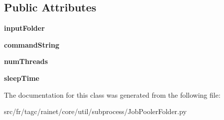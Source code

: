 \subsection*{Public Attributes}
\begin{DoxyCompactItemize}
\item 
\hypertarget{classsrc_1_1fr_1_1tagc_1_1rainet_1_1core_1_1util_1_1subprocess_1_1JobPoolerFolder_1_1JobPoolerFolder_a09a5abc8e78560dda7f866e0ab3025b1}{{\bfseries input\-Folder}}\label{classsrc_1_1fr_1_1tagc_1_1rainet_1_1core_1_1util_1_1subprocess_1_1JobPoolerFolder_1_1JobPoolerFolder_a09a5abc8e78560dda7f866e0ab3025b1}

\item 
\hypertarget{classsrc_1_1fr_1_1tagc_1_1rainet_1_1core_1_1util_1_1subprocess_1_1JobPoolerFolder_1_1JobPoolerFolder_a1effb681768d567a895cbfd76f79bd23}{{\bfseries command\-String}}\label{classsrc_1_1fr_1_1tagc_1_1rainet_1_1core_1_1util_1_1subprocess_1_1JobPoolerFolder_1_1JobPoolerFolder_a1effb681768d567a895cbfd76f79bd23}

\item 
\hypertarget{classsrc_1_1fr_1_1tagc_1_1rainet_1_1core_1_1util_1_1subprocess_1_1JobPoolerFolder_1_1JobPoolerFolder_a842b71dce3d982f8d87a89381025559f}{{\bfseries num\-Threads}}\label{classsrc_1_1fr_1_1tagc_1_1rainet_1_1core_1_1util_1_1subprocess_1_1JobPoolerFolder_1_1JobPoolerFolder_a842b71dce3d982f8d87a89381025559f}

\item 
\hypertarget{classsrc_1_1fr_1_1tagc_1_1rainet_1_1core_1_1util_1_1subprocess_1_1JobPoolerFolder_1_1JobPoolerFolder_a778e7aa392237232731f9f14244b5d5c}{{\bfseries sleep\-Time}}\label{classsrc_1_1fr_1_1tagc_1_1rainet_1_1core_1_1util_1_1subprocess_1_1JobPoolerFolder_1_1JobPoolerFolder_a778e7aa392237232731f9f14244b5d5c}

\end{DoxyCompactItemize}


The documentation for this class was generated from the following file\-:\begin{DoxyCompactItemize}
\item 
src/fr/tagc/rainet/core/util/subprocess/Job\-Pooler\-Folder.\-py\end{DoxyCompactItemize}

